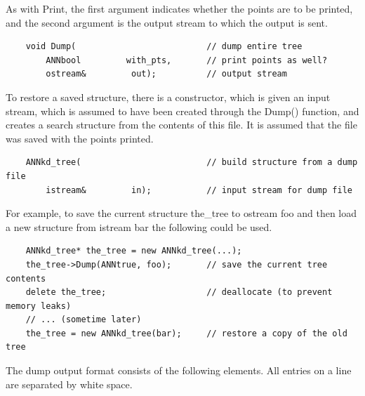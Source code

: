\documentclass[11pt]{article}		%
\begin{document}
As with Print, the first argument indicates whether the points are to be
printed, and the second argument is the output stream to which the
output is sent.

{\small \begin{verbatim}
    void Dump(                          // dump entire tree
        ANNbool         with_pts,       // print points as well?
        ostream&         out);          // output stream
\end{verbatim} }

To restore a saved structure, there is a constructor, which is given an
input stream, which is assumed to have been created through the \textsf{Dump()}
function, and creates a search structure from the contents of this file.
It is assumed that the file was saved with the points printed.

{\small \begin{verbatim}
    ANNkd_tree(                         // build structure from a dump file
        istream&         in);           // input stream for dump file
\end{verbatim} }

For example, to save the current structure \textsf{the\_tree} to ostream
\textsf{foo} and then load a new structure from istream \textsf{bar} the
following could be used.

{\small \begin{verbatim}
    ANNkd_tree* the_tree = new ANNkd_tree(...);
    the_tree->Dump(ANNtrue, foo);       // save the current tree contents
    delete the_tree;                    // deallocate (to prevent memory leaks)
    // ... (sometime later)
    the_tree = new ANNkd_tree(bar);     // restore a copy of the old tree
\end{verbatim} }

The dump output format consists of the following elements.  All entries
on a line are separated by white space.
\end{document}
